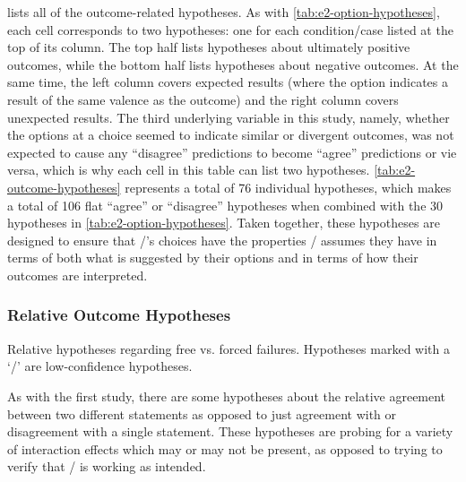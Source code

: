  lists all of the outcome-related hypotheses.
%
As with \cref{tab:e2-option-hypotheses}, each cell corresponds to two hypotheses: one for each condition/case listed at the top of its column.
%
The top half lists hypotheses about ultimately positive outcomes, while the bottom half lists hypotheses about negative outcomes.
%
At the same time, the left column covers expected results (where the option indicates a result of the same valence as the outcome) and the right column covers unexpected results.
%
The third underlying variable in this study, namely, whether the options at a choice seemed to indicate similar or divergent outcomes, was not expected to cause any ``disagree'' predictions to become ``agree'' predictions or vie versa, which is why each cell in this table can list two hypotheses.
%
\cref{tab:e2-outcome-hypotheses} represents a total of 76 individual hypotheses, which makes a total of 106 flat ``agree'' or ``disagree'' hypotheses when combined with the 30 hypotheses in \cref{tab:e2-option-hypotheses}.
%
Taken together, these hypotheses are designed to ensure that \dunyazad/'s choices have the properties \dunyazad/ assumes they have in terms of both what is suggested by their options and in terms of how their outcomes are interpreted.

\subsubsection{Relative Outcome Hypotheses}

\begin{table}[!h]
\centering
\bgroup
\def\arraystretch{1.3}
\setlength{\tabcolsep}{0.6em}

\egroup
\caption[Retrospective free vs. forced failure hypotheses]{Relative hypotheses regarding free vs. forced failures. Hypotheses marked with a `\lc/' are low-confidence hypotheses.}
  \label{tab:e2-free-vs-forced-failure-hypotheses}
\end{table}

As with the first study, there are some hypotheses about the relative agreement between two different statements as opposed to just agreement with or disagreement with a single statement.
%
These hypotheses are probing for a variety of interaction effects which may or may not be present, as opposed to trying to verify that \dunyazad/ is working as intended.


